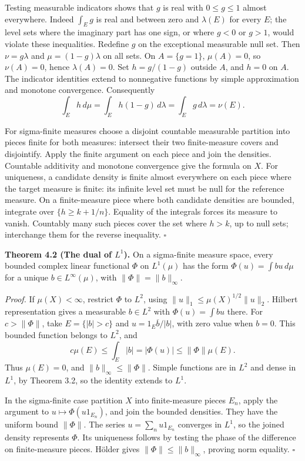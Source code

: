 \documentclass[
  english,
  11pt,
  a4paper,
]{article}
\begin{document}
Testing measurable indicators shows that \(g\) is real with
\(0\leq g\leq1\) almost everywhere. Indeed \(\int_Eg\) is real and
between zero and \(\lambda(E)\) for every \(E\); the level sets where
the imaginary part has one sign, or where \(g<0\) or \(g>1\), would
violate these inequalities. Redefine \(g\) on the exceptional measurable
null set. Then \(\nu=g\lambda\) and \(\mu=(1-g)\lambda\) on all sets. On
\(A=\{g=1\}\), \(\mu(A)=0\), so \(\nu(A)=0\), hence \(\lambda(A)=0\).
Set \(h=g/(1-g)\) outside \(A\), and \(h=0\) on \(A\). The indicator
identities extend to nonnegative functions by simple approximation and
monotone convergence. Consequently
\[\int_Eh\,d\mu=\int_Eh(1-g)\,d\lambda=\int_Eg\,d\lambda=\nu(E).\]

For sigma-finite measures choose a disjoint countable measurable
partition into pieces finite for both measures: intersect their two
finite-measure covers and disjointify. Apply the finite argument on each
piece and join the densities. Countable additivity and monotone
convergence give the formula on \(X\). For uniqueness, a candidate
density is finite almost everywhere on each piece where the target
measure is finite: its infinite level set must be null for the reference
measure. On a finite-measure piece where both candidate densities are
bounded, integrate over \(\{h\geq k+1/n\}\). Equality of the integrals
forces its measure to vanish. Countably many such pieces cover the set
where \(h>k\), up to null sets; interchange them for the reverse
inequality. \(\square\)

\textbf{Theorem 4.2 (The dual of \(L^1\)).} On a sigma-finite measure
space, every bounded complex linear functional \(\Phi\) on \(L^1(\mu)\)
has the form \(\Phi(u)=\int bu\,d\mu\) for a unique
\(b\in L^\infty(\mu)\), with \(\|\Phi\|=\|b\|_\infty\).

\emph{Proof.} If \(\mu(X)<\infty\), restrict \(\Phi\) to \(L^2\), using
\(\|u\|_1\leq\mu(X)^{1/2}\|u\|_2\). Hilbert representation gives a
measurable \(b\in L^2\) with \(\Phi(u)=\int bu\) there. For
\(c>\|\Phi\|\), take \(E=\{|b|>c\}\) and \(u=1_E\overline b/|b|\), with
zero value when \(b=0\). This bounded function belongs to \(L^2\), and
\[c\mu(E)\leq\int_E|b|=|\Phi(u)|\leq\|\Phi\|\mu(E).\] Thus \(\mu(E)=0\),
and \(\|b\|_\infty\leq\|\Phi\|\). Simple functions are in \(L^2\) and
dense in \(L^1\), by Theorem 3.2, so the identity extends to \(L^1\).

In the sigma-finite case partition \(X\) into finite-measure pieces
\(E_n\), apply the argument to \(u\mapsto\Phi(u1_{E_n})\), and join the
bounded densities. They have the uniform bound \(\|\Phi\|\). The series
\(u=\sum_nu1_{E_n}\) converges in \(L^1\), so the joined density
represents \(\Phi\). Its uniqueness follows by testing the phase of the
difference on finite-measure pieces. Hölder gives
\(\|\Phi\|\leq\|b\|_\infty\), proving norm equality. \(\square\)
\end{document}
